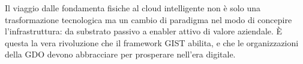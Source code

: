 Il viaggio dalle fondamenta fisiche al cloud intelligente non è solo una trasformazione tecnologica ma un cambio di paradigma nel modo di concepire l'infrastruttura: da substrato passivo a enabler attivo di valore aziendale. È questa la vera rivoluzione che il framework GIST abilita, e che le organizzazioni della GDO devono abbracciare per prosperare nell'era digitale.

\clearpage
\printbibliography[
    heading=subbibliography,
    title={Riferimenti Bibliografici del Capitolo 3},
]

% 